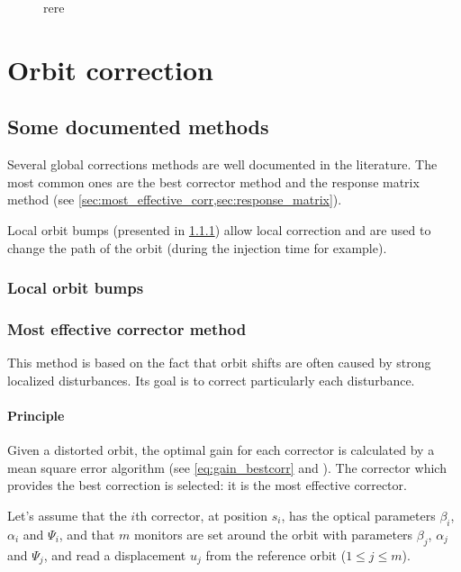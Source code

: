 \begin{figure}
    \centering
{}
\caption{rere}
\end{figure}
\chapter{Orbit correction}
\label{sec:correction}
\section{Some documented methods}
Several global corrections methods are well documented in the literature. The most common ones are the best corrector method and the response matrix method (see \cref{sec:most_effective_corr,sec:response_matrix}). 

Local orbit bumps (presented in \cref{sec:orbit_bump}) allow local correction and are used to change the path of the orbit (during the injection time for example).

\subsection{Local orbit bumps}
\label{sec:orbit_bump}

\subsection{Most effective corrector method}
\label{sec:most_effective_corr}
This method is based on the fact that orbit shifts are often caused by strong localized disturbances. Its goal is to correct particularly each disturbance.

\subsubsection{Principle}

Given a distorted orbit, the optimal gain for each corrector is calculated by a mean square error algorithm (see \cref{eq:gain_bestcorr} and \cite{book:wille}). The corrector which provides the best correction is selected: it is the most effective corrector.

Let's assume that the $i$th corrector, at position $s_i$, has the optical parameters $\beta_i$, $\alpha_i$ and $\Psi_i$, and that $m$ monitors are set around the orbit with parameters $\beta_j$, $\alpha_j$ and $\Psi_j$, and read a displacement $u_j$ from the reference orbit ($1 \leq j \leq m$).

